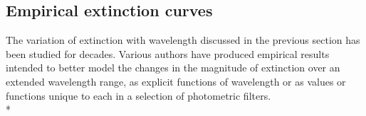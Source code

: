 \documentclass[12pt, a4paper]{report}
\begin{document}








\subsection{Empirical extinction curves} \label{empirical}

The variation of extinction with wavelength discussed in the previous section has been studied for decades. Various authors have produced empirical results intended to better model the changes in the magnitude of extinction over an extended wavelength range, as explicit functions of wavelength or as values or functions unique to each in a selection of photometric filters.\\*
\end{document}
